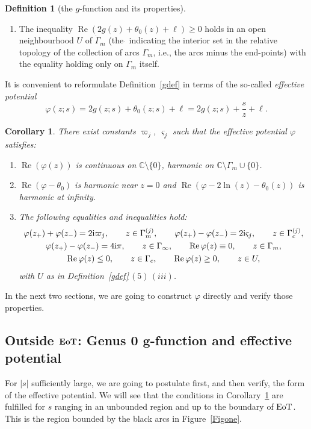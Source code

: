 \documentclass[pdftex]{sigma}
\numberwithin{equation}{section}
\newtheorem{Corollary}[Theorem]{Corollary}
\theoremstyle{definition}
\newtheorem{Definition}[Theorem]{Definition}
\def\le{\left}
\def\ri{\right}
\def\be{\begin{equation}}
\def\ee{\end{equation}}
\def\C{{\mathbb C}}
\def \Re{\operatorname{Re} }
\begin{document}
\begin{Definition}[the $g$-function and its properties]
\begin{enumerate}
\begin{enumerate}
\item [(iii)]
The inequality
$
\Re\le(2g(z)+ \theta_0(z) + \ell \ri) \geq 0
$
holds
in an open neighbourhood $U$ of $\dot \Gamma_m$ (the $\dot{}$ indicating the interior set in the relative topology of the collection of arcs $\Gamma_m$, i.e., the arcs minus the end-points) with the equality holding only on $\Gamma_m$ itself.
\end{enumerate}
\end{enumerate}
\end{Definition}

 It is convenient to reformulate Definition~\ref{gdef} in terms of the so-called {\it effective potential}
 \be
\label{defphi}
\varphi(z;s) = 2g(z;s) + \theta_0(z;s) + \ell = 2g(z;s) + \frac s z +\ell.
\ee
\begin{Corollary}
\label{corphicond}
There exist constants $\varpi_j$, $\varsigma_j$ such that the effective potential $\varphi$ satisfies:
\begin{enumerate}\itemsep=0pt
\item[$(1)$]
$\Re(\varphi(z))$ is continuous on $\C\setminus \{0\}$, harmonic on $\C\setminus \Gamma_m\cup \{0\}$.
\item[$(2)$] $\Re(\varphi- \theta_0)$ is harmonic near $z=0$ and $\Re(\varphi -2\ln(z) - \theta_0(z))$ is harmonic at infinity.
\item[$(3)$] The following equalities and inequalities hold:
\begin{gather*}%
\varphi(z_+) + \varphi(z_-) = 2{\rm i}{\varpi}_j,\qquad z\in \Gamma_{m}^{(j)},\qquad
\varphi(z_+)-\varphi(z_-) =2 {\rm i}{\varsigma}_j, \qquad z\in \Gamma_{c}^{(j)},\\
\varphi(z_+)-\varphi(z_-) = 4{\rm i}\pi,\qquad z\in \Gamma_\infty,\qquad
\Re\varphi(z)\equiv 0, \qquad z\in \Gamma_m,\\
\Re\varphi(z)\leq 0,\qquad z\in \Gamma_c,\qquad
\Re \varphi(z)\geq 0,\qquad z\in U,
\end{gather*}
with $U$ as in Definition~{\rm\ref{gdef}}\,$(5)\,(iii)$.
\end{enumerate}
\end{Corollary}
In the next two sections, we are going to construct $\varphi$ directly and verify those properties.

 \subsection[Outside EoT: Genus 0 $g$-function and effective potential]{Outside $\boldsymbol{{\rm EoT}}$: Genus $\boldsymbol{0}$ $\boldsymbol{g}$-function and effective potential}
 \label{gzero}
 For $|s|$ sufficiently large, we are going to postulate first, and then verify, the form of the effective potential. We will see that the conditions in Corollary~\ref{corphicond} are fulfilled for $s$ ranging in an unbounded region and up to the boundary of ${\rm EoT}$. This is the region bounded by the black arcs in Figure~\ref{Figone}.
\end{document}
